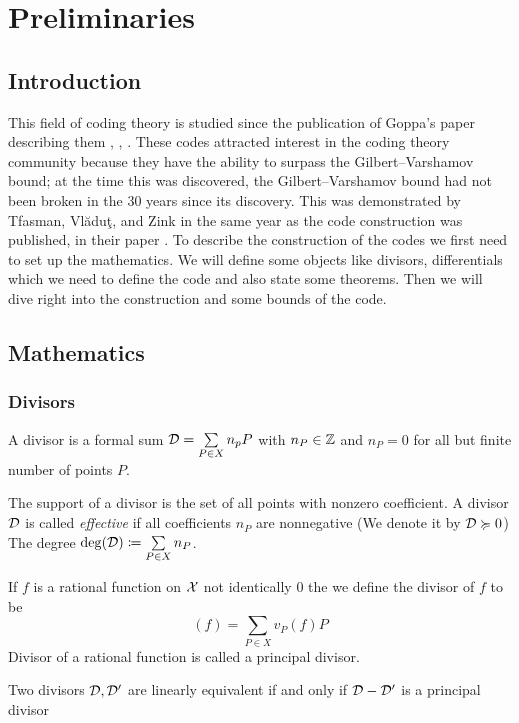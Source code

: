 \chapter{Preliminaries}
\section{Introduction}
This field of coding theory is studied since the publication of Goppa's paper describing them \cite{goppafirst}, \cite{Goppa1981CodesOA}, \cite{Goppa1984CodesAI}. These codes attracted interest in the coding theory community because they have the ability to surpass the Gilbert–Varshamov bound; at the time this was discovered, the Gilbert–Varshamov bound had not been broken in the 30 years since its discovery. This was demonstrated by Tfasman, Vl\u{a}du\c{t}, and Zink in the same year as the code construction was published, in their paper  \cite{tvzbound}. To describe the construction of the codes we first need to set up the mathematics. We will define some objects like divisors, differentials which we need to define the code and also state some theorems. Then we will dive right into the construction and some bounds of the code.
\section{Mathematics}
\subsection{Divisors}
\begin{definition}[Divisor]
	A divisor is a formal sum $\mathcal{D}=\sum\limits_{P\in X}n_pP$ with $n_P\in \mathbb{Z}$ and $n_P=0$ for all but finite number of points $P$.	
\end{definition}
	The support of a divisor is the set of all points with nonzero coefficient. A divisor $\mathcal{D}$ is called \textit{effective}  if all coefficients $n_P$ are nonnegative (We denote it by $\mathcal{D}\succcurlyeq 0$) The degree $\deg(\mathcal{D})\coloneqq \sum\limits_{P\in X}n_P$.
	\begin{definition}
		If $f$ is a rational function on $\mathcal{X}$ not identically $0$ the we define the divisor of $f$ to be $$(f)=\sum_{P\in X}v_P(f)P$$Divisor of a rational function is called a principal divisor.
	\end{definition}
	Two divisors $\mathcal{D},\mathcal{D}'$ are linearly equivalent if and only if $\mathcal{D}-\mathcal{D}'$ is a principal divisor
